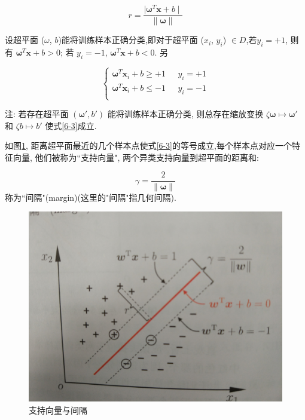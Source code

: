 \documentclass[12pt]{article}
\numberwithin{equation}{section}%
\begin{document}
\begin{equation}
r=\dfrac{\mid \boldsymbol{\omega}^{T}\boldsymbol{x}+b \mid}{\parallel \boldsymbol{\omega} \parallel}
\end{equation}

设超平面 \boldmath($\omega$, \unboldmath$b$)能将训练样本正确分类,即对于超平面 \boldmath($x_{i}$, \unboldmath$y_{i}$) $\in D$,若$y_{i}=+1$, 则有
$ \boldsymbol{\omega}^{T}\boldsymbol{x}+b>0$; 若 $y_{i}=-1$, $ \boldsymbol{\omega}^{T}\boldsymbol{x}+b<0$. 另

\begin{equation}
\label{6-3}
 \left\{ \begin{array}{ll}
 \boldsymbol{\omega}^{T}\boldsymbol{x}_{i}+b \geqslant +1 & \textrm{ $y_{i}=+1$}\\
\boldsymbol{\omega}^{T}\boldsymbol{x}_{i}+b \leqslant -1  &  \textrm{ $y_{i}=-1$}\\
\end{array} \right.
\end{equation}

\textcolor[rgb]{0.2,0.3,0.6}{注: 若存在超平面 $(\boldsymbol{\omega}', b')$ 能将训练样本正确分类, 则总存在缩放变换 $\zeta \boldsymbol{\omega} \longmapsto \boldsymbol{\omega}'$ 和 $\zeta b \longmapsto b'$ 使式\ref{6-3}成立.}

如图\ref{6-2}, 距离超平面最近的几个样本点使式\ref{6-3}的等号成立,每个样本点对应一个特征向量, 他们被称为``支持向量", 两个异类支持向量到超平面的距离和:

\begin{equation}
\gamma=\frac{2}{\parallel \boldsymbol{\omega} \parallel}
\end{equation}
称为``间隔"(margin)(这里的"间隔"指几何间隔).
\begin{figure}
\centering\includegraphics[width=5in]{6-2.jpg}
\caption{支持向量与间隔}
\label{6-2}
\end{figure}
\end{document}

